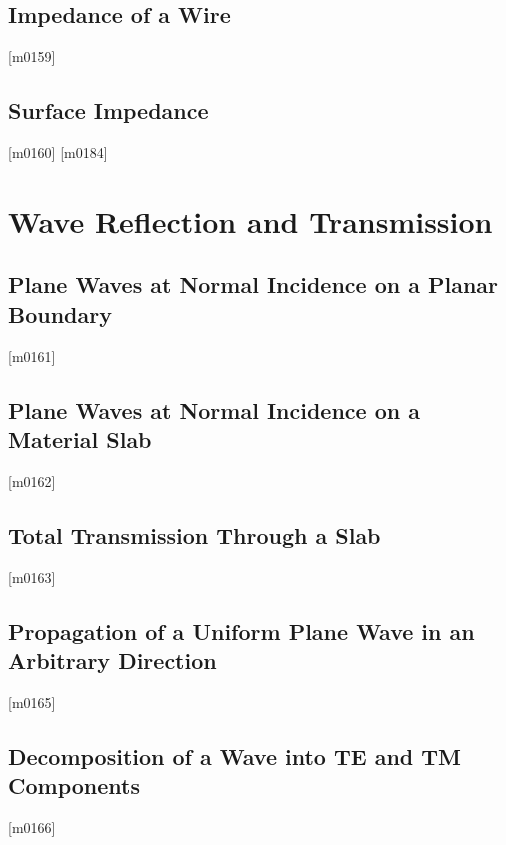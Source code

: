\documentclass[10pt,letterpaper,twocolumn,openany]{book}
\theoremstyle{definition} %
\begin{document}
    \section{Impedance of a Wire}
{\color{blue}\tiny[m0159]}      
      \vfill\break
    \section{Surface Impedance}
{\color{blue}\tiny[m0160]}      
{\color{blue}\tiny[m0184]}    
  \chapter{Wave Reflection and Transmission}
  \thispagestyle{fancy} %
  \fancyhf{}            %
    \section{Plane Waves at Normal Incidence on a Planar Boundary}
{\color{blue}\tiny[m0161]}      
      \vfill\break
    \section{Plane Waves at Normal Incidence on a Material Slab}
{\color{blue}\tiny[m0162]}      
      \vfill\break
    \section{Total Transmission Through a Slab}
{\color{blue}\tiny[m0163]}      
      \vfill\break
    \section{Propagation of a Uniform Plane Wave in an Arbitrary Direction}
{\color{blue}\tiny[m0165]}      
      \vfill\break
    \section{Decomposition of a Wave into TE and TM Components}
{\color{blue}\tiny[m0166]}      
      \vfill\break
\end{document}

